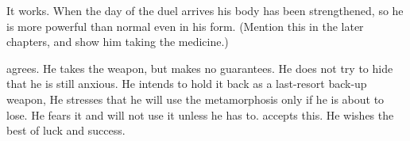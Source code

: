 It works. 
When the day of the duel arrives his body has been strengthened, so he is more powerful than normal even in his \resphan{} form. 
(Mention this in the later \Teshrial chapters, and show him taking the medicine.)

\Teshrial agrees. 
He takes the weapon, but makes no guarantees. 
He does not try to hide that he is still anxious. 
He intends to hold it back as a last-resort back-up weapon, 
He stresses that he will use the metamorphosis only if he is about to lose. 
He fears it and will not use it unless he has to. 
\Azraid accepts this. 
He wishes \Teshrial the best of luck and success. 





